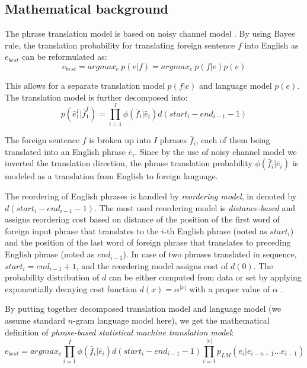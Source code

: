 \subsection{Mathematical background}

The phrase translation model is based on noisy channel model \citep{koehn:spbt}.
By using Bayes rule, the translation probability for translating foreign sentence $f$
into English as $e_{best}$ can be reformulated as:
\begin{equation}
  e_{best} = argmax_{e}~p(e|f) =  argmax_{e}~p(f|e)p(e)
\end{equation}

This allows for a separate translation model $p(f|e)$ and language model $p(e)$.
The translation model is further decomposed into:
\begin{equation} \label{eq:tm}
  p(\bar{e}_1^I|\bar{f}_1^I) = \prod_{i=1}^I \phi(\bar{f}_i|\bar{e}_i) d(start_i - end_{i-1} - 1)
\end{equation}

The foreign sentence $f$ is broken up into $I$ phrases $\bar{f}_i$, each of them
being translated into an English phrase $\bar{e}_i$. Since by the use of noisy channel
model we inverted the translation direction, the phrase translation probability
$\phi(\bar{f}_i|\bar{e}_i)$ is modeled as a translation from English to foreign language.

The reordering of English phrases is handled by \emph{reordering model}, in 
denoted by $d(start_i - end_{i-1} - 1)$.
The most used reordering model is \emph{distance-based} and assigns reordering cost based
on distance of the position of the first word of foreign input phrase that translates to
the $i$-th English phrase (noted as $start_i$) and the position of the last word of foreign
phrase that translates to preceding English phrase (noted as $end_{i-1}$).
In case of two phrases translated in sequence, $start_i = end_{i-1} +1$, and the
reordering model assigns cost of $d(0)$.
The probability distribution of $d$ can be either computed from data or set by applying
exponentially decaying cost function $d(x) = \alpha^{|x|}$ with a proper value of $\alpha$
\citep{koehn:smt}.

By putting together decomposed translation model and language model (we assume standard $n$-gram
language model here), we get the mathematical definition of
\emph{phrase-based statistical machine translation model}:
\begin{equation} \label{eq:pbsmt}
  e_{best} = argmax_e \prod_{i=1}^I \phi(\bar{f}_i|\bar{e}_i) d(start_i - end_{i-1} - 1) \prod_{i=1}^{|e|} p_{LM}(e_i|e_{i-n+1}...e_{i-1})
\end{equation}

